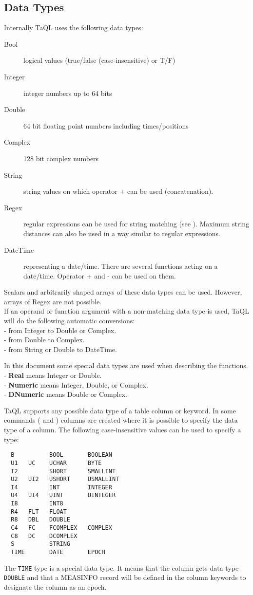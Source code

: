 \subsection{\label{TAQL:DATATYPES}Data Types}
Internally TaQL uses the following data types:
\begin{description}
  \item[Bool ] logical values (true/false (case-insensitive) or T/F)
  \item[Integer ] integer numbers up to 64 bits
  \item[Double ] 64 bit floating point numbers including times/positions
  \item[Complex ] 128 bit complex numbers
  \item[String ] string values on which operator + can be used (concatenation).
  \item[Regex ] regular expressions can be used for string
    matching (see ). Maximum string
    distances can also be used in a way similar to regular
    expressions. 
  \item[DateTime ] representing a date/time. There are several functions
       acting on a date/time. Operator + and - can be used on them.
\end{description}
Scalars and arbitrarily shaped arrays of these data types can be used.
However, arrays of Regex are not possible.
\\If an operand or function argument with a non-matching data type
is used, TaQL will do the following automatic conversions:
\\- from Integer to Double or Complex.
\\- from Double to Complex.
\\- from String or Double to DateTime.

In this document some special data types are used when describing the functions.
\\- \textbf{Real} means Integer or Double.
\\- \textbf{Numeric} means Integer, Double, or Complex.
\\- \textbf{DNumeric} means Double or Complex.

\label{TAQL:DATATYPESTRING}
TaQL supports any possible data type of a table column or keyword.
In some commands ( and
) columns are created where
it is possible to specify the data type of a column. 
The following case-insensitive values can be used to specify a type:
\begin{verbatim}
  B          BOOL       BOOLEAN
  U1   UC    UCHAR      BYTE
  I2         SHORT      SMALLINT
  U2   UI2   USHORT     USMALLINT
  I4         INT        INTEGER
  U4   UI4   UINT       UINTEGER
  I8         INT8
  R4   FLT   FLOAT
  R8   DBL   DOUBLE
  C4   FC    FCOMPLEX   COMPLEX
  C8   DC    DCOMPLEX
  S          STRING
  TIME       DATE       EPOCH
\end{verbatim}
The \texttt{TIME} type is a special data type. It means that the column
gets data type \texttt{DOUBLE} and that a MEASINFO record will be
defined in the column keywords to designate the column as an epoch.

